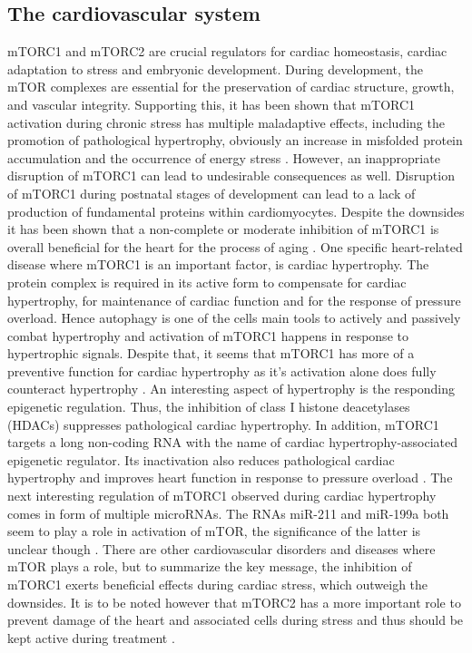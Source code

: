\documentclass[12pt]{article} %
\begin{document}
\begin{linenumbers*}
\subsection{The cardiovascular system}
mTORC1 and mTORC2 are crucial regulators for cardiac homeostasis, cardiac adaptation to stress and embryonic development. During development, the mTOR complexes are essential for the preservation of cardiac structure, growth, and vascular integrity. Supporting this, it has been shown that mTORC1 activation during chronic stress has multiple maladaptive effects, including the promotion of pathological hypertrophy, obviously an increase in misfolded protein accumulation and the occurrence of energy stress \citep{Sciarretta2018}.
However, an inappropriate disruption of mTORC1 can lead to undesirable consequences as well. Disruption of mTORC1 during postnatal stages of development can lead to a lack of production of fundamental proteins within cardiomyocytes. Despite the downsides it has been shown that a non-complete or moderate inhibition of mTORC1 is overall beneficial for the heart for the process of aging \citep{Sciarretta2018}.
One specific heart-related disease where mTORC1 is an important factor, is cardiac hypertrophy. The protein complex is required in its active form to compensate for cardiac hypertrophy, for maintenance of cardiac function and for the response of pressure overload. Hence autophagy is one of the cells main tools to actively and passively combat hypertrophy and activation of mTORC1 happens in response to hypertrophic signals. Despite that, it seems that mTORC1 has more of a preventive function for cardiac hypertrophy as it's activation alone does fully counteract hypertrophy \citep{Sciarretta2018}. 
An interesting aspect of hypertrophy is the responding epigenetic regulation. Thus, the inhibition of class I histone deacetylases (HDACs) suppresses pathological cardiac hypertrophy. In addition, mTORC1 targets a long non-coding RNA with the name of cardiac hypertrophy-associated epigenetic regulator. Its inactivation also reduces pathological cardiac hypertrophy and improves heart function in response to pressure overload \citep{Sciarretta2018}.
The next interesting regulation of mTORC1 observed during cardiac hypertrophy comes in form of multiple microRNAs. The RNAs miR-211 and miR-199a both seem to play a role in activation of mTOR, the significance of the latter is unclear though \citep{Sciarretta2018}.
There are other cardiovascular disorders and diseases where mTOR plays a role, but to summarize the key message, the inhibition of mTORC1 exerts beneficial effects during cardiac stress, which outweigh the downsides. It is to be noted however that mTORC2 has a more important role to prevent damage of the heart and associated cells during stress and thus should be kept active during treatment \citep{Sciarretta2018}.



\end{linenumbers*}
\end{document}
